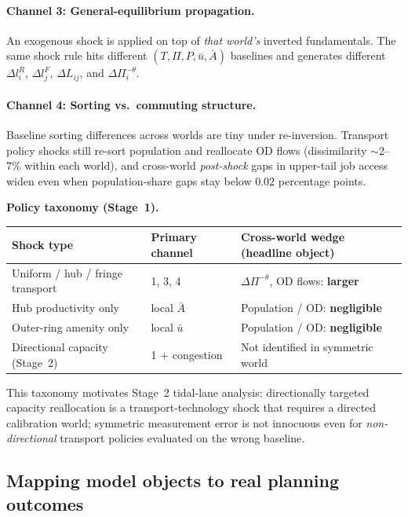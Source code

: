 \documentclass[12pt]{article}
\begin{document}
\paragraph{Channel 3: General-equilibrium propagation.}
An exogenous shock is applied on top of \emph{that world's} inverted fundamentals.
The same shock rule hits different $(T,\Pi,P,\bar u,\bar A)$ baselines and generates
different $\Delta l_i^R$, $\Delta l_j^F$, $\Delta L_{ij}$, and $\Delta\Pi_i^{-\theta}$.

\paragraph{Channel 4: Sorting vs.\ commuting structure.}
Baseline sorting differences across worlds are tiny under re-inversion.
Transport policy shocks still re-sort population and reallocate OD flows
(dissimilarity $\sim$2--7\% within each world), and cross-world \emph{post-shock}
gaps in upper-tail job access widen even when population-share gaps stay below
$0.02$ percentage points.

\medskip
\noindent\textbf{Policy taxonomy (Stage~1).}
\begin{center}
\small
\begin{tabular}{p{}p{}p{}}
\toprule
Shock type & Primary channel & Cross-world wedge (headline object) \\
\midrule
Uniform / hub / fringe transport & 1, 3, 4 & $\Delta\Pi^{- \theta}$, OD flows: \textbf{larger} \\
Hub productivity only & local $\bar A$ & Population / OD: \textbf{negligible} \\
Outer-ring amenity only & local $\bar u$ & Population / OD: \textbf{negligible} \\
Directional capacity (Stage~2) & 1 + congestion & Not identified in symmetric world \\
\bottomrule
\end{tabular}
\end{center}

This taxonomy motivates Stage~2 tidal-lane analysis: directionally targeted capacity
reallocation is a transport-technology shock that requires a directed calibration world;
symmetric measurement error is not innocuous even for \emph{non-directional} transport
policies evaluated on the wrong baseline.

\subsection{Mapping model objects to real planning outcomes}\label{sec:outcomes_map}
\end{document}

